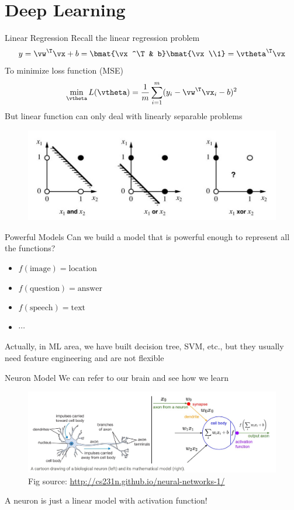\documentclass{../TexTemplate/myslide}
\begin{document}
\section{Deep Learning}
\begin{frame}
\sectionpage
\end{frame}

\begin{frame}{Linear Regression}
Recall the linear regression problem
\[y=\vw^\T\vx+b=\bmat{\vx^\T & b}\bmat{\vx\\1}=\vtheta^\T\vx\]
To minimize loss function (MSE)
\[\min_{\vtheta} L(\vtheta)=\frac{1}{m}\sum_{i=1}^m(y_i-\vw^\T\vx_i-b)^2\]
But linear function can only deal with linearly separable problems
\begin{figure}
\centering
\includegraphics[width=0.8\linewidth]{fig/linearly-separable.jpeg}
\end{figure}
\end{frame}

\begin{frame}{Powerful Models}
Can we build a model that is powerful enough to represent all the functions?
\begin{itemize}
	\item $f(\text{image})=\text{location}$
	\item $f(\text{question})=\text{answer}$
	\item $f(\text{speech})=\text{text}$
	\item $\cdots$
\end{itemize}
\pause
Actually, in ML area, we have built decision tree, SVM, etc., but they usually need feature engineering and are not flexible
\end{frame}

\begin{frame}{Neuron Model}
We can refer to our brain and see how we learn
\begin{figure}[H]
\centering
\includegraphics[width=\linewidth]{fig/neuron_model.png}
\caption*{\small Fig source: \url{http://cs231n.github.io/neural-networks-1/}}
\end{figure}
\pause
A neuron is just a linear model with activation function!
\end{frame}
\end{document}
